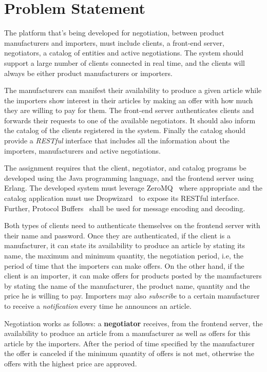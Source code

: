 
\section{Problem Statement}
\label{sec:problem}

The platform that's being developed for negotiation, between product manufacturers and importers, must include clients, a front-end server, negotiators, a catalog of entities and active negotiations.
The system should support a large number of clients connected in real time, and the clients will always be either product manufacturers or importers.

The manufacturers can manifest their availability to produce a given article while the importers show interest in their articles by making an offer with how much they are willing to pay for them.
The front-end server authenticates clients and forwards their requests to one of the available negotiators. It should also inform the catalog of the clients registered in the system.
Finally the catalog should provide a \emph{RESTful} interface that includes all the information about the importers, manufacturers and active negotiations. 

The assignment requires that the client, negotiator, and catalog programs be developed using the Java programming language, and the frontend server using Erlang. The developed system must leverage ZeroMQ~\cite{website:zeromq} where appropriate and the catalog application must use Dropwizard~\cite{website:dropwizard} to expose its RESTful interface.
Further, Protocol Buffers~\cite{website:protobuf} shall be used for message encoding and decoding.

Both types of clients need to authenticate themselves on the frontend server with their name and password. Once they are authenticated, if the client is a manufacturer, it can state its availability to produce an article by stating its name, the maximum and minimum quantity, the negotiation period, i.e, the period of time that the importers can make offers.
On the other hand, if the client is an importer, it can make offers for products posted by the manufacturers by stating the name of the manufacturer, the product name, quantity and the price he is willing to pay. Importers may also \emph{subscribe} to a certain manufacturer to receive a \emph{notification} every time he announces an article. 
        
Negotiation works as follows: a \textbf{negotiator} receives, from the frontend server, the availability to produce an article from a manufacturer as well as offers for this article by the importers. After the period of time specified by the manufacturer the offer is canceled if the minimum quantity of offers is not met, otherwise the offers with the highest price are approved.   

